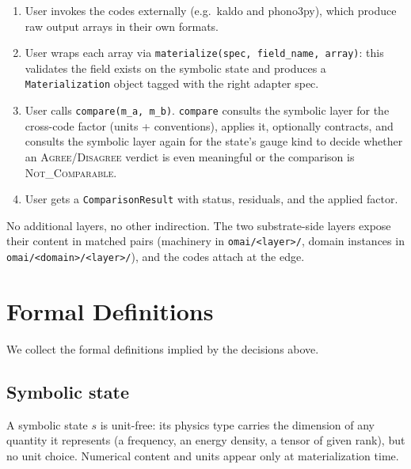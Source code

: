 \documentclass[11pt,a4paper]{article}
\begin{document}
\begin{enumerate}[leftmargin=2em, itemsep=0.2em]
  \item User invokes the codes externally (e.g.\ kaldo and phono3py),
        which produce raw output arrays in their own formats.
  \item User wraps each array via \texttt{materialize(spec, field\_name,
        array)}: this validates the field exists on the symbolic state
        and produces a \texttt{Materialization} object tagged with the
        right adapter spec.
  \item User calls \texttt{compare(m\_a, m\_b)}. \texttt{compare} consults
        the symbolic layer for the cross-code factor (units +
        conventions), applies it, optionally contracts, and consults the
        symbolic layer again for the state's gauge kind to decide whether
        an \textsc{Agree}/\textsc{Disagree} verdict is even meaningful or
        the comparison is \textsc{Not\_Comparable}.
  \item User gets a \texttt{ComparisonResult} with status, residuals,
        and the applied factor.
\end{enumerate}

\noindent No additional layers, no other indirection. The two
substrate-side layers expose their content in matched pairs (machinery
in \texttt{omai/<layer>/}, domain instances in
\texttt{omai/<domain>/<layer>/}), and the codes attach at the edge.

\medskip

\section{Formal Definitions}
\label{sec:defs}

We collect the formal definitions implied by the decisions above.

\subsection{Symbolic state}

A symbolic state $s$ is unit-free: its physics type carries the dimension of any
quantity it represents (a frequency, an energy density, a tensor of given rank), but no
unit choice. Numerical content and units appear only at materialization time.

\medskip
\end{document}
